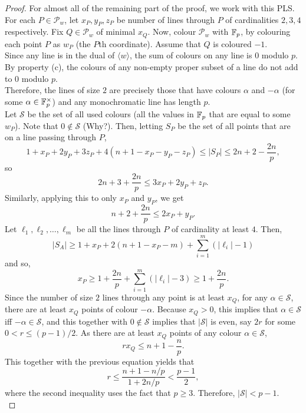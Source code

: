 \begin{proof}
		For almost all of the remaining part of the proof, we work with this PLS.\\
		For each $P \in \mathcal{P}_w$, let $x_P,y_P,z_P$ be number of lines through $P$ of cardinalities $2,3,4$ respectively. Fix $Q \in \mathcal{P}_w$ of minimal $x_Q$. Now, colour $\mathcal{P}_w$ with $\mathbb{F}_p$, by colouring each point $P$ as $w_P$ (the $P$th coordinate). Assume that $Q$ is coloured $-1$.\\
		Since any line is in the dual of $\langle w \rangle$, the sum of colours on any line is $0$ modulo $p$.\\
		By property (c), the colours of any non-empty proper subset of a line do not add to $0$ modulo $p$.\\
		Therefore, the lines of size $2$ are precisely those that have colours $\alpha$ and $-\alpha$ (for some $\alpha \in \mathbb{F}_p^\times$) and any monochromatic line has length $p$.\\
		Let $\mathcal{S}$ be the set of all used colours (all the values in $\mathbb{F}_p$ that are equal to some $w_P$). Note that $0 \not\in \mathcal{S}$ (Why?). Then, letting $S_P$ be the set of all points that are on a line passing through $P$,
		\[ 1 + x_P + 2 y_P + 3 z_P + 4(n+1 - x_P - y_P - z_P) \le |S_P| \le 2n+2-\frac{2n}{p}, \]
		so
		\begin{equation}
			\label{eqn: xP yP zP joint bound}
			2n+3+\frac{2n}{p} \le 3 x_P + 2 y_P + z_P.
		\end{equation}
		Similarly, applying this to only $x_P$ and $y_P$, we get
		\begin{equation}
			\label{eqn: xP yP joint bound}
			n+2+\frac{2n}{p} \le 2x_P + y_P.
		\end{equation}
		Let $\ell_1,\ell_2,\ldots,\ell_m$ be all the lines through $P$ of cardinality at least $4$. Then,
		\[ |S_A| \ge 1 + x_P + 2(n+1 - x_P - m) + \sum_{i = 1}^{m} (|\ell_i| - 1) \]
		and so,
		\begin{equation}
			\label{eqn: xP line bound}
			x_P \ge 1 + \frac{2n}{p} + \sum_{i=1}^{m} (|\ell_i| - 3) \ge 1 + \frac{2n}{p}.	
		\end{equation}
		Since the number of size $2$ lines through any point is at least $x_Q$, for any $\alpha \in \mathcal{S}$, there are at least $x_Q$ points of colour $-\alpha$. Because $x_Q > 0$, this implies that $\alpha \in \mathcal{S}$ iff $-\alpha \in \mathcal{S}$, and this together with $0 \not\in \mathcal{S}$ implies that $|\mathcal{S}|$ is even, say $2r$ for some $0 < r \le (p-1)/2$. As there are at least $x_Q$ points of any colour $\alpha \in \mathcal{S}$,
		\begin{equation}
			\label{eqn: xQ bound}
			r x_Q \le n + 1 - \frac{n}{p}.	
		\end{equation}
		This together with the previous equation yields that
		\[ r \le \frac{n+1 - n/p}{1 + 2n/p} < \frac{p-1}{2}, \]
		where the second inequality uses the fact that $p \ge 3$. Therefore, $|\mathcal{S}| < p-1$.\\



\end{proof}

